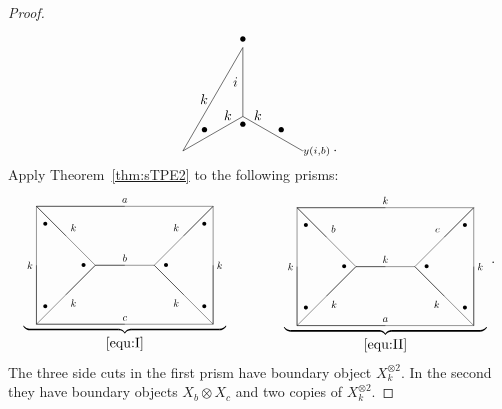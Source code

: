 \documentclass{amsart}
\begin{document}
\begin{proof}
\[{{{{\begin{tikzpicture}[scale=1.5]
\draw (1,1.732) node [above] {$\bullet$} -- (.5,.866) node [left] {$k$}; \draw (.5,.866) -- (0,0);
\draw (0,0) -- (.75,.433) node [above] {$k$}; \draw (.75,.433) -- (1,0.577);
\draw (1,0.577) node [below] {$\bullet$} -- (1,1.1545) node [left] {$i$}; \draw (1,1.1545) -- (1,1.732);
\draw (1,0.577) -- (1.25,.433) node [above] {$k$}; \draw (1.25,.433) -- (2,0);
\node at (.36,.35) {$\bullet$};
\node at (2-.36,.35) {$\bullet$};
\end{tikzpicture}}}}}_{y(i,b)}\,.
\]
Apply Theorem~\ref{thm:sTPE2} to the following prisms:
\[
\underbrace{\vcenter{\hbox{\scalebox{.74}{\begin{tikzpicture}[scale=2]
\draw (0,2)--(3,2);
\draw (1,1)--(2,1);
\draw (0,0)--(3,0);
\draw (0,0) -- (0,2) -- (1,1) -- (0,0);
\draw (3,0)--(3,2)--(2,1)--(3,0);
\draw (0,2) -- (1.5,2) node [above] {$a$};
\draw (1,1) -- (1.5,1) node [above] {$b$};
\draw (0,0) -- (1.5,0) node [above] {$c$};
\draw (0,2) --++ (.5,-.5) node [above right=1pt] {$k$};
\draw (1,1) --++ (-.5,-.5) node [below right=1pt] {$k$};
\draw (0,0) -- (0,1) node [left] {$k$};
\draw (3,2) --++ (-.5,-.5) node [above left=1pt] {$k$};
\draw (2,1) --++ (.5,-.5) node [below left=1pt] {$k$};
\draw (3,0) -- (3,1) node [right] {$k$};
\node at (0+.15,2-.3) {$\bullet$};
\node at (1-.2,1) {$\bullet$};
\node at (0+.15,0+.3) {$\bullet$};
\node at (3-.15,2-.3) {$\bullet$};
\node at (2+.2,1) {$\bullet$};
\node at (3-.15,0+.3) {$\bullet$};
\end{tikzpicture}}}}}_{\eqref{equ:I}}\qquad\qquad\underbrace{\vcenter{\hbox{\scalebox{.74}{\begin{tikzpicture}[scale=2]
\draw (0,2)--(3,2);
\draw (1,1)--(2,1);
\draw (0,0)--(3,0);
\draw (0,0) -- (0,2) -- (1,1) -- (0,0);
\draw (3,0)--(3,2)--(2,1)--(3,0);
\draw (0,2) -- (1.5,2) node [above] {$k$};
\draw (1,1) -- (1.5,1) node [above] {$k$};
\draw (0,0) -- (1.5,0) node [above] {$a$};
\draw (0,2) --++ (.5,-.5) node [above right=1pt] {$b$};
\draw (1,1) --++ (-.5,-.5) node [below right=1pt] {$k$};
\draw (0,0) -- (0,1) node [left] {$k$};
\draw (3,2) --++ (-.5,-.5) node [above left=1pt] {$c$};
\draw (2,1) --++ (.5,-.5) node [below left=1pt] {$k$};
\draw (3,0) -- (3,1) node [right] {$k$};
\node at (0+.15,2-.3) {$\bullet$};
\node at (1-.2,1) {$\bullet$};
\node at (0+.15,0+.3) {$\bullet$};
\node at (3-.15,2-.3) {$\bullet$};
\node at (2+.2,1) {$\bullet$};
\node at (3-.15,0+.3) {$\bullet$};
\end{tikzpicture}}}}}_{\eqref{equ:II}}\,.
\]
The three side cuts in the first prism have boundary object $X_k^{\otimes2}$. In the
second they have boundary objects $X_b\otimes X_c$ and two copies of $X_k^{\otimes2}$.

\end{proof}
\end{document}
